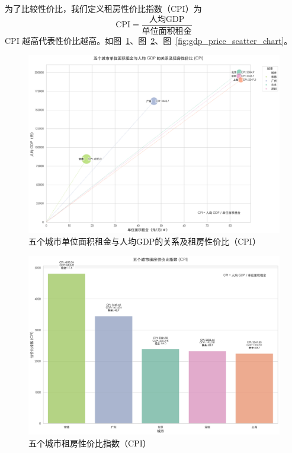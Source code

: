 为了比较性价比，我们定义租房性价比指数（CPI）为\[
    \text{CPI} = \frac{\text{人均GDP}}{\text{单位面积租金}}
\]
CPI 越高代表性价比越高。如图~\ref{fig:gdp_unit_price_scatter_chart}、图~\ref{fig:cpi_bar_chart}、图~\ref{fig:gdp_price_scatter_chart}。
\begin{figure}[htbp]
    \centering
    \includegraphics[width=0.7\linewidth]{../../figure/gdp_unit_price_scatter_chart.png}
    \caption{五个城市单位面积租金与人均GDP的关系及租房性价比（CPI）}
    \label{fig:gdp_unit_price_scatter_chart}
\end{figure}
\begin{figure}[htbp]
    \centering
    \includegraphics[width=0.7\linewidth]{../../figure/cpi_bar_chart.png}
    \caption{五个城市租房性价比指数（CPI）}
    \label{fig:cpi_bar_chart}
\end{figure}

